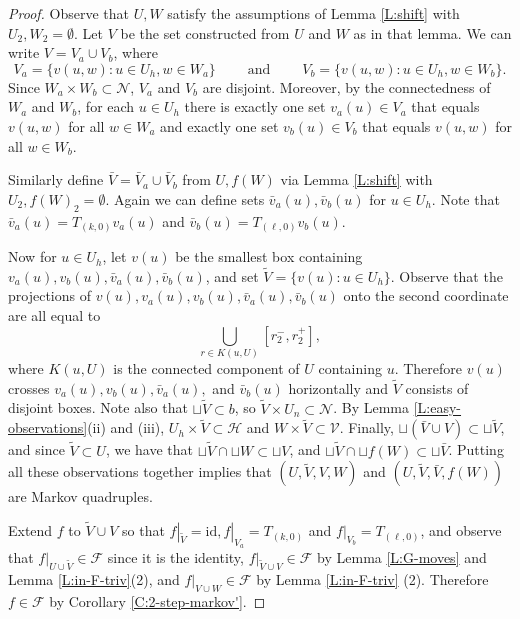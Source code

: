 \documentclass[aop, preprint]{imsart}
\theoremstyle{plain}
\theoremstyle{definition}
\theoremstyle{plain}
\newcommand{\sset}{\subset}
\newcommand{\mathand}{\;\text{and}\;}
\newcommand{\scrV}{\mathcal{V}}
\newcommand{\scrH}{\mathcal{H}}
\newcommand{\scrN}{\mathcal{N}}
\newcommand{\scrF}{\mathcal{F}}
\newcommand{\X}{\times}
\newcommand{\id}{\text{id}}
\begin{document}
\begin{proof}
	Observe that $U, W$ satisfy the assumptions of Lemma \ref{L:shift} with $U_2, W_2 = \emptyset$. Let $V$ be the set constructed from $U$ and $W$ as in that lemma. We can write $V = V_a \cup V_b$, where 
	$$
	V_a = \{v(u, w) : u \in U_h, w \in W_a\} \qquad \mathand \qquad V_b = \{v(u, w) : u \in U_h, w \in W_b\}.
	$$
	Since $W_a \X W_b \sset \scrN$, $V_a$ and $V_b$ are disjoint. Moreover, by the connectedness of $W_a$ and $W_b$, for each $u \in U_h$ there is exactly one set $v_a(u) \in V_a$ that equals $v(u, w)$ for all $w \in W_a$ and exactly one set $v_b(u) \in V_b$ that equals $v(u, w)$ for all $w \in W_b$.
	
	Similarly define $\bar V = \bar V_a \cup \bar V_b$ from $U, f(W)$ via Lemma \ref{L:shift} with $U_2, f(W)_2 = \emptyset.$ Again we can define sets $\bar v_a(u), \bar v_b(u)$ for $u \in U_h$. Note that $\bar v_a(u) = T_{(k,0)}v_a(u)$ and $\bar v_b(u) = T_{(\ell,0)}v_b(u)$.
	
	Now for $u \in U_h$, let $v(u)$ be the smallest box containing $v_a(u), v_b(u), \bar v_a(u), \bar v_b(u)$, and set $\tilde V = \{v(u) : u \in U_h\}$. Observe that the projections of $v(u), v_a(u), v_b(u), \bar v_a(u), \bar v_b(u)$ onto the second coordinate are all equal to 
	$$
	\bigcup_{r \in K(u, U)} [r_2^-, r_2^+],
	$$
	where $K(u, U)$ is the connected component of $U$ containing $u$. Therefore $v(u)$  crosses $v_a(u), v_b(u), \bar v_a(u),$ and $\bar v_b(u)$ horizontally and $\tilde V$ consists of disjoint boxes. Note also that $\sqcup \tilde V \sset b$, so $\tilde V \X U_n \sset \scrN$. By Lemma \ref{L:easy-observations}(ii) and (iii), $U_h \X \tilde V \sset \scrH$ and $W \X \tilde V \sset \scrV$. Finally, $\sqcup (\bar V \cup V) \sset \sqcup \tilde V$, and since $\tilde V \sset U$, we have that $\sqcup \tilde V \cap \sqcup W \sset \sqcup V$, and $\sqcup \tilde V \cap \sqcup f(W) \sset \sqcup \bar V$. Putting all these observations together implies that $(U, \tilde V, V,W)$ and $(U, \tilde V, \bar V, f(W))$ are Markov quadruples.
	
	Extend $f$ to $\tilde V \cup V$ so that $f|_{\tilde V} = \id, f|_{V_a} = T_{(k, 0)}$ and $f|_{V_b} = T_{(\ell, 0)}$, and observe that $f|_{U \cup \tilde V} \in \scrF$ since it is the identity, $f|_{\tilde V \cup V} \in \scrF$ by Lemma \ref{L:G-moves} and Lemma \ref{L:in-F-triv}(2), and $f|_{V \cup W} \in \scrF$ by Lemma \ref{L:in-F-triv} (2). Therefore $f \in \scrF$ by Corollary \ref{C:2-step-markov'}.
\end{proof}
\end{document}
